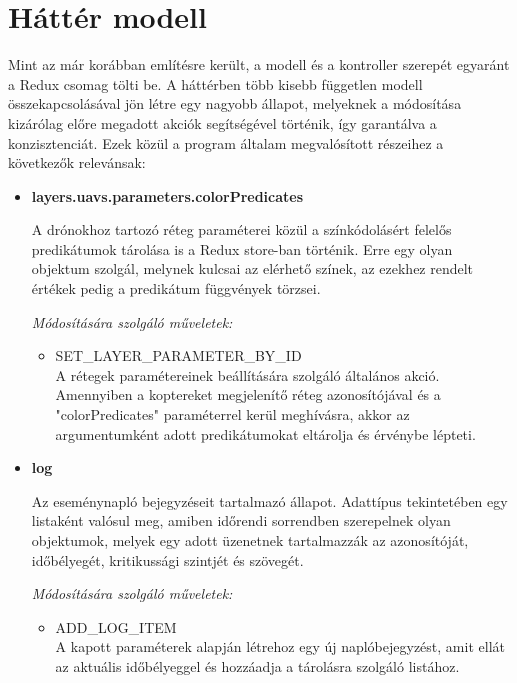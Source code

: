 \section{Háttér modell}

Mint az már korábban említésre került, a modell és a kontroller szerepét
egyaránt a Redux csomag tölti be. A háttérben több kisebb független modell
összekapcsolásával jön létre egy nagyobb állapot, melyeknek a módosítása
kizárólag előre megadott akciók segítségével történik, így garantálva a
konzisztenciát. Ezek közül a program általam megvalósított részeihez a
következők relevánsak:

\begin{itemize}

  \item \textbf{layers.uavs.parameters.colorPredicates}

    A drónokhoz tartozó réteg paraméterei közül a színkódolásért felelős
    predikátumok tárolása is a Redux store-ban történik. Erre egy olyan objektum
    szolgál, melynek kulcsai az elérhető színek, az ezekhez rendelt értékek
    pedig a predikátum függvények törzsei.

    \textit{Módosítására szolgáló műveletek:}

    \begin{itemize}
      \item SET\_LAYER\_PARAMETER\_BY\_ID \\
        A rétegek paramétereinek beállítására szolgáló általános akció.
        Amennyiben a koptereket megjelenítő réteg azonosítójával és a
        "colorPredicates" paraméterrel kerül meghívásra, akkor az argumentumként
        adott predikátumokat eltárolja és érvénybe lépteti.
    \end{itemize}

  \item \textbf{log}

    Az eseménynapló bejegyzéseit tartalmazó állapot. Adattípus tekintetében egy
    listaként valósul meg, amiben időrendi sorrendben szerepelnek olyan
    objektumok, melyek egy adott üzenetnek tartalmazzák az azonosítóját,
    időbélyegét, kritikussági szintjét és szövegét.

    \textit{Módosítására szolgáló műveletek:}

    \begin{itemize}
      \item ADD\_LOG\_ITEM \\
        A kapott paraméterek alapján létrehoz egy új naplóbejegyzést, amit ellát
        az aktuális időbélyeggel és hozzáadja a tárolásra szolgáló listához.


\end{itemize}
\end{itemize}
